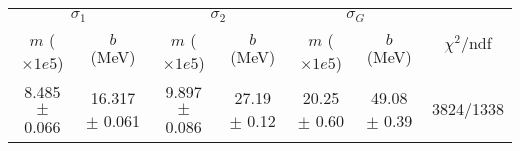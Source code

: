 \begin{tabular}{cc|cc|cc||c}
\multicolumn{2}{c|}{$\sigma_1$} & \multicolumn{2}{|c}{$\sigma_2$} & \multicolumn{2}{|c}{$\sigma_G$}  & \multirow{2}{*}{$\chi^2/$ndf}\\
$m$ ($\times1e5$) & $b$ (MeV) & $m$ ($\times1e5$) & $b$ (MeV) & $m$ ($\times1e5$) & $b$ (MeV) & \\
\hline
8.485 $\pm$ 0.066 & 16.317 $\pm$ 0.061 & 9.897 $\pm$ 0.086 & 27.19 $\pm$ 0.12 & 20.25 $\pm$ 0.60 & 49.08 $\pm$ 0.39 & 3824/1338\\
\end{tabular}
